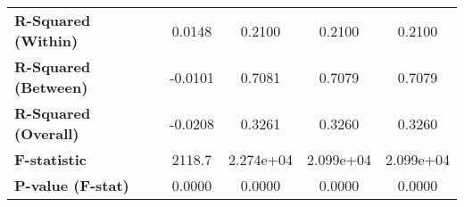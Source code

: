 {\begin{longtable}{>{\bfseries}lcccc}
\textbf{R-Squared (Within)}                &       0.0148       &             0.2100            &             0.2100            &         0.2100         \\
\textbf{R-Squared (Between)}               &      -0.0101       &             0.7081            &             0.7079            &         0.7079         \\
\textbf{R-Squared (Overall)}               &      -0.0208       &             0.3261            &             0.3260            &         0.3260         \\
\textbf{F-statistic}                       &       2118.7       &           2.274e+04           &           2.099e+04           &       2.099e+04        \\
\textbf{P-value (F-stat)}                  &       0.0000       &             0.0000            &             0.0000            &         0.0000         \\
\bottomrule
\end{longtable}
}
